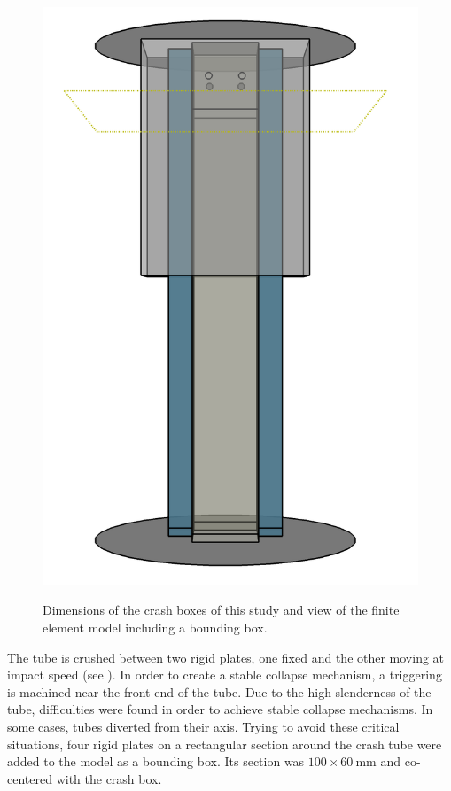 \documentclass[cmfonts]{witpress}
\begin{document}
\begin{figure}[ht]
\begin{minipage}[b]{.48\linewidth}
    \includegraphics[width=0.9\linewidth]{figures/IMG_CUTRES/general_transp}
    \label{fig:general}
  \end{minipage}
  \caption{Dimensions of the crash boxes of this study and view of the finite element model including a bounding box.}
  \label{fig:modelo}
\end{figure}

The tube is crushed between two rigid plates, one fixed and the other moving at impact speed (see ). In order to create a stable collapse mechanism, a triggering is machined near the front end of the tube. Due to the high slenderness of the tube, difficulties were found in order to achieve stable collapse mechanisms. In some cases, tubes diverted from their axis. Trying to avoid these critical situations, four rigid plates on a rectangular section around the crash tube were added to the model as a bounding box. Its section was $\num{100}\times\SI{60}{\mm}$ and co-centered with the crash box.
\end{document}
